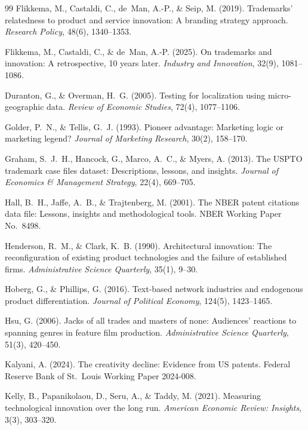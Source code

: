 \begin{thebibliography}{99}
Flikkema, M., Castaldi, C., de~Man, A.-P., \& Seip, M. (2019). Trademarks'
relatedness to product and service innovation: A branding strategy
approach. \emph{Research Policy}, 48(6), 1340--1353.

Flikkema, M., Castaldi, C., \& de~Man, A.-P. (2025). On trademarks and
innovation: A retrospective, 10 years later. \emph{Industry and
Innovation}, 32(9), 1081--1086.

Duranton, G., \& Overman, H.~G. (2005). Testing for localization using
micro-geographic data. \emph{Review of Economic Studies}, 72(4),
1077--1106.

Golder, P.~N., \& Tellis, G.~J. (1993). Pioneer advantage: Marketing logic or
marketing legend? \emph{Journal of Marketing Research}, 30(2), 158--170.

Graham, S.~J.~H., Hancock, G., Marco, A.~C., \& Myers, A. (2013). The USPTO
trademark case files dataset: Descriptions, lessons, and insights.
\emph{Journal of Economics \& Management Strategy}, 22(4), 669--705.

Hall, B.~H., Jaffe, A.~B., \& Trajtenberg, M. (2001). The NBER patent
citations data file: Lessons, insights and methodological tools. NBER
Working Paper No.\ 8498.

Henderson, R.~M., \& Clark, K.~B. (1990). Architectural innovation: The
reconfiguration of existing product technologies and the failure of
established firms. \emph{Administrative Science Quarterly}, 35(1), 9--30.

Hoberg, G., \& Phillips, G. (2016). Text-based network industries and
endogenous product differentiation. \emph{Journal of Political Economy},
124(5), 1423--1465.

Hsu, G. (2006). Jacks of all trades and masters of none: Audiences'
reactions to spanning genres in feature film production.
\emph{Administrative Science Quarterly}, 51(3), 420--450.

Kalyani, A. (2024). The creativity decline: Evidence from US patents.
Federal Reserve Bank of St.\ Louis Working Paper 2024-008.

Kelly, B., Papanikolaou, D., Seru, A., \& Taddy, M. (2021). Measuring
technological innovation over the long run. \emph{American Economic
Review: Insights}, 3(3), 303--320.


\end{thebibliography}
